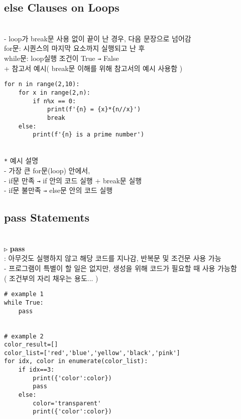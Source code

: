 \documentclass[11pt,a4paper]{article}
\begin{document}
\begin{spacing}{1.5}
\subsection{\Large\textbf{else Clauses on Loops}}\\
- loop가 break문 사용 없이 끝이 난 경우, 다음 문장으로 넘어감\\
\hspace*{2em}for문: 시퀀스의 마지막 요소까지 실행되고 난 후\\
\hspace*{2em}while문: loop실행 조건이 True    \texttt{→}    False\\

+ 참고서 예시( break문 이해를 위해 참고서의 예시 사용함  )
\begin{lstlisting}[label={list:first}]
for n in range(2,10):
    for x in range(2,n):
        if n%x == 0:
            print(f'{n} = {x}*{n//x}')
            break
    else:
        print(f'{n} is a prime number')
\end{lstlisting}\\

\texttt{*} 예시 설명\\
- 가장 큰 for문(loop) 안에서,\\
- if문 만족 \texttt{→} if 안의 코드 실행 + break문 실행\\
- if문 불만족 \texttt{→} else문 안의 코드 실행

\subsection{\Large\textbf{pass Statements}}\\
\texttt{▷} \textbf{pass}\\
: 아무것도 실행하지 않고 해당 코드를 지나감, 반복문 및 조건문 사용 가능\\

- 프로그램이 특별이 할 일은 없지만, 생성을 위해 코드가 필요할 때 사용 가능함\\
\hspace*{1em}( 조건부의 자리 채우는 용도... )
\begin{lstlisting}[label={list:first}]
# example 1
while True:
    pass


# example 2
color_result=[]
color_list=['red','blue','yellow','black','pink']
for idx, color in enumerate(color_list):
    if idx==3:
        print({'color':color})
        pass
    else:
        color='transparent'
        print({'color':color})
\end{lstlisting}\\


\end{spacing}
\end{document}
